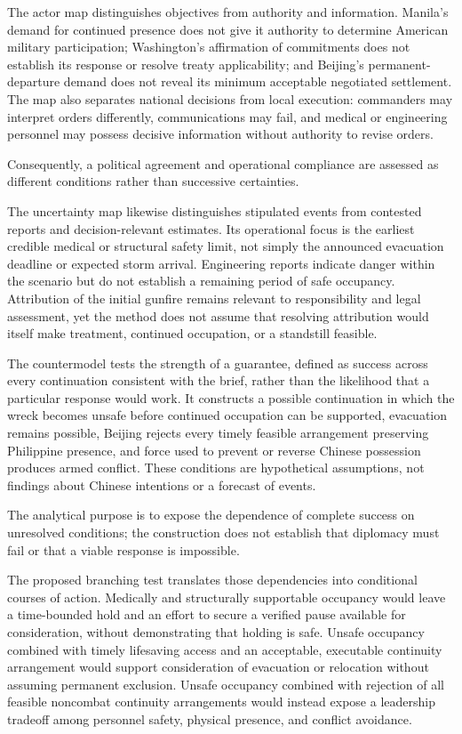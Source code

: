 \documentclass[11pt]{article}
\begin{document}
The actor map distinguishes objectives from authority and information. Manila’s demand for continued presence does not give it authority to determine American military participation; Washington’s affirmation of commitments does not establish its response or resolve treaty applicability; and Beijing’s permanent-departure demand does not reveal its minimum acceptable negotiated settlement. The map also separates national decisions from local execution: commanders may interpret orders differently, communications may fail, and medical or engineering personnel may possess decisive information without authority to revise orders.

Consequently, a political agreement and operational compliance are assessed as different conditions rather than successive certainties.

The uncertainty map likewise distinguishes stipulated events from contested reports and decision-relevant estimates. Its operational focus is the earliest credible medical or structural safety limit, not simply the announced evacuation deadline or expected storm arrival. Engineering reports indicate danger within the scenario but do not establish a remaining period of safe occupancy. Attribution of the initial gunfire remains relevant to responsibility and legal assessment, yet the method does not assume that resolving attribution would itself make treatment, continued occupation, or a standstill feasible.

The countermodel tests the strength of a guarantee, defined as success across every continuation consistent with the brief, rather than the likelihood that a particular response would work. It constructs a possible continuation in which the wreck becomes unsafe before continued occupation can be supported, evacuation remains possible, Beijing rejects every timely feasible arrangement preserving Philippine presence, and force used to prevent or reverse Chinese possession produces armed conflict. These conditions are hypothetical assumptions, not findings about Chinese intentions or a forecast of events.

The analytical purpose is to expose the dependence of complete success on unresolved conditions; the construction does not establish that diplomacy must fail or that a viable response is impossible.

The proposed branching test translates those dependencies into conditional courses of action. Medically and structurally supportable occupancy would leave a time-bounded hold and an effort to secure a verified pause available for consideration, without demonstrating that holding is safe. Unsafe occupancy combined with timely lifesaving access and an acceptable, executable continuity arrangement would support consideration of evacuation or relocation without assuming permanent exclusion. Unsafe occupancy combined with rejection of all feasible noncombat continuity arrangements would instead expose a leadership tradeoff among personnel safety, physical presence, and conflict avoidance.
\end{document}
